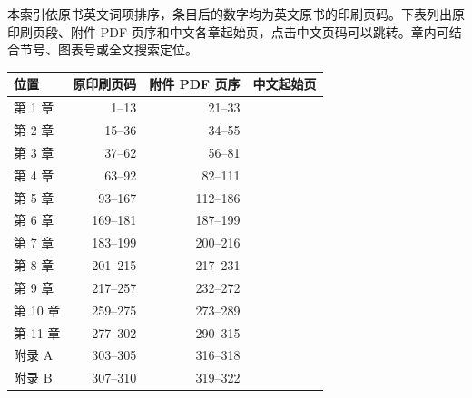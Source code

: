 
本索引依原书英文词项排序，条目后的数字均为英文原书的印刷页码。下表列出原印刷页段、附件 PDF 页序和中文各章起始页，点击中文页码可以跳转。章内可结合节号、图表号或全文搜索定位。

\begin{center}
\small
\begin{tabular}{lrrr}
\toprule
位置 & 原印刷页码 & 附件 PDF 页序 & 中文起始页\\
\midrule
第 1 章 & 1–13 & 21–33 & \pageref{chapter:start:1}\\
第 2 章 & 15–36 & 34–55 & \pageref{chapter:start:2}\\
第 3 章 & 37–62 & 56–81 & \pageref{chapter:start:3}\\
第 4 章 & 63–92 & 82–111 & \pageref{chapter:start:4}\\
第 5 章 & 93–167 & 112–186 & \pageref{chapter:start:5}\\
第 6 章 & 169–181 & 187–199 & \pageref{chapter:start:6}\\
第 7 章 & 183–199 & 200–216 & \pageref{chapter:start:7}\\
第 8 章 & 201–215 & 217–231 & \pageref{chapter:start:8}\\
第 9 章 & 217–257 & 232–272 & \pageref{chapter:start:9}\\
第 10 章 & 259–275 & 273–289 & \pageref{chapter:start:10}\\
第 11 章 & 277–302 & 290–315 & \pageref{chapter:start:11}\\
附录 A & 303–305 & 316–318 & \pageref{app:algebra}\\
附录 B & 307–310 & 319–322 & \pageref{app:probability}\\
\bottomrule
\end{tabular}
\end{center}

